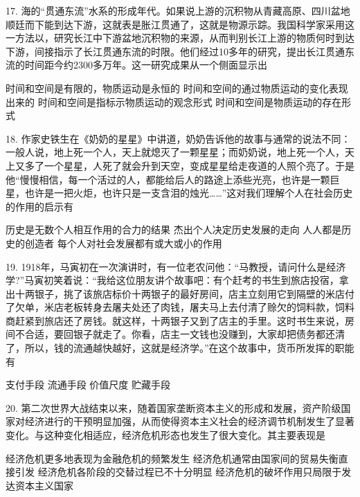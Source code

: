 17.  海的“贯通东流”水系的形成年代。如果说上游的沉积物从青藏高原、四川盆地顺廷而下能到达下游，这就表是胀江贯通了，这就是物源示踪。我国科学家采用这一方法以，研究长江中下游盆地沉积物的来源，从而判别长江上游的物质何时到达下游，间接指示了长江贯通东流的时限。他们经过10多年的研究，提出长江贯通东流的时间距今约2300多万年。这一研究成果从一个侧面显示出
\begin{choices}
	  时间和空间是有限的，物质运动是永恒的
	  时间和空间的通过物质运动的变化表现出来的
	  时间和空间是指标示物质运动的观念形式
	  时间和空间是物质运动的存在形式
\end{choices}

18. 作家史铁生在《奶奶的星星》中讲道，奶奶告诉他的故事与通常的说法不同：一般人说，地上死一个人，天上就熄灭了一颗星星；而奶奶说，地上死一个人，天上又多了一个星星，人死了就会升到天空，变成星星给走夜道的人照个亮了。于是他“慢慢相信，每一个活过的人，都能给后人的路途上添些光亮，也许是一颗巨星，也许是一把火炬，也许只是一支含泪的烛光……”这对我们理解个人在社会历史的作用的启示有
\begin{choices}
	  历史是无数个人相互作用的合力的结果
	  杰出个人决定历史发展的走向
	  人人都是历史的创造者
	  每个人对社会发展都有或大或小的作用
\end{choices}

19. 1918年，马寅初在一次演讲时，有一位老农问他：“马教授，请问什么是经济学?”马寅初笑着说：“我给这位朋友讲个故事吧：有个赶考的书生到旅店投宿，拿出十两银子，挑了该旅店标价十两银子的最好房间，店主立刻用它到隔壁的米店付了欠单，米店老板转身去屠夫处还了肉钱，屠夫马上去付清了赊欠的饲料款，饲料商赶紧到旅店还了房钱。就这样，十两银子又到了店主的手里。这时书生来说，房间不合适，要回银子就走了。你看，店主一文钱也没赚到，大家却把债务都还清了，所以，钱的流通越快越好，这就是经济学。”在这个故事中，货币所发挥的职能有
\begin{choices}
	  支付手段
	  流通手段
	  价值尺度
	  贮藏手段
\end{choices}

20. 第二次世界大战结束以来，随着国家垄断资本主义的形成和发展，资产阶级国家对经济进行的干预明显加强，从而使得资本主义社会的经济调节机制发生了显著变化。与这种变化相适应，经济危机形态也发生了很大变化。其主要表现是
\begin{choices}
	  经济危机更多地表现为金融危机的频繁发生
	  经济危机通常由国家间的贸易失衡直接引发
	  经济危机各阶段的交替过程已不十分明显
	  经济危机的破坏作用只局限于发达资本主义国家
\end{choices}

